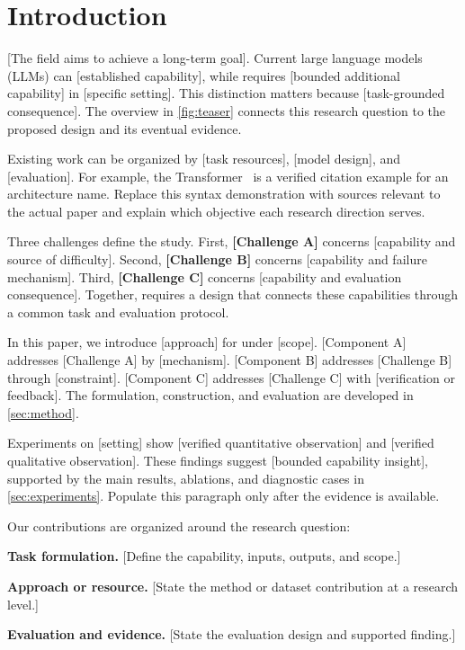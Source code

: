 \section{Introduction}
\label{sec:introduction}

[The field aims to achieve a long-term goal]. Current large language models (LLMs) can [established capability], while \CoreTerm{} requires [bounded additional capability] in [specific setting]. This distinction matters because [task-grounded consequence]. The overview in \cref{fig:teaser} connects this research question to the proposed design and its eventual evidence.

Existing work can be organized by [task resources], [model design], and [evaluation]. For example, the Transformer~\citep{vaswani2017attention} is a verified citation example for an architecture name. Replace this syntax demonstration with sources relevant to the actual paper and explain which objective each research direction serves.

Three challenges define the study. First, \textbf{[Challenge A]} concerns [capability and source of difficulty]. Second, \textbf{[Challenge B]} concerns [capability and failure mechanism]. Third, \textbf{[Challenge C]} concerns [capability and evaluation consequence]. Together, \CoreTerm{} requires a design that connects these capabilities through a common task and evaluation protocol.

In this paper, we introduce [approach] for \CoreTerm{} under [scope]. [Component A] addresses [Challenge A] by [mechanism]. [Component B] addresses [Challenge B] through [constraint]. [Component C] addresses [Challenge C] with [verification or feedback]. The formulation, construction, and evaluation are developed in \cref{sec:method}.

Experiments on [setting] show [verified quantitative observation] and [verified qualitative observation]. These findings suggest [bounded capability insight], supported by the main results, ablations, and diagnostic cases in \cref{sec:experiments}. Populate this paragraph only after the evidence is available.

Our contributions are organized around the research question:
\begin{compactitem}
\item \textbf{Task formulation.} [Define the capability, inputs, outputs, and scope.]
\item \textbf{Approach or resource.} [State the method or dataset contribution at a research level.]
\item \textbf{Evaluation and evidence.} [State the evaluation design and supported finding.]
\end{compactitem}
